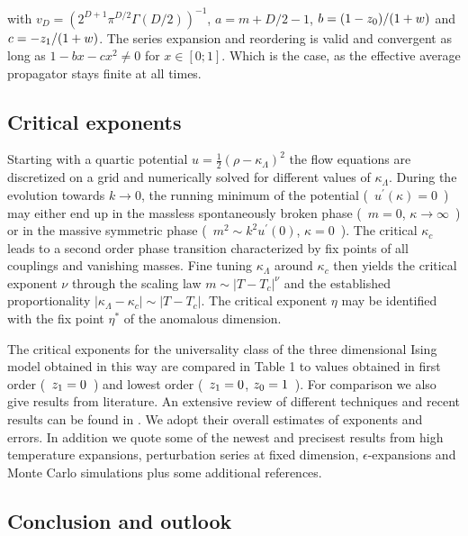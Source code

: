\documentclass[a4paper,aps,prl,twocolumn,groupedaddress]{revtex4}
\begin{document}
\bigskip
\noindent
with $ v_D = (2^{D+1} \pi^{D/2} \Gamma(D/2))^{-1} $, $ a = m+D/2-1 $, $ b = (1-z_0)/(1+w) $ and 
$ c = -z_1/(1+w) $. The series expansion and reordering is valid and convergent as long as
$ 1-bx-cx^2 \neq 0 $ for $ x \in [0;1] $. Which is the case, as the effective average propagator stays finite at all times.




\newpage
\subsection*{Critical exponents}

\noindent
Starting with a quartic potential $ u = \frac{1}{2}(\rho - \kappa_\Lambda)^2 $ 
the flow equations are discretized on a grid and numerically solved for different values of 
$ \kappa_\Lambda $. During the evolution towards $ k \to 0 $, the running minimum of the
potential (~$u^\prime(\kappa)=0$~) may either end up in the massless spontaneously broken phase 
(~$m=0$, $\kappa \to \infty $~) or in the massive symmetric phase (~$ m^2 \sim k^2 u^\prime(0)$, $\kappa = 0 $~). 
The critical $ \kappa_c $ leads to a second order phase transition characterized by fix points 
of all couplings and vanishing masses. Fine tuning $ \kappa_\Lambda $ around $ \kappa_c $ then
yields the critical exponent $ \nu $ through the scaling law $ m \sim | T-T_c |^\nu $
and the established proportionality $ | \kappa_\Lambda - \kappa_c | \sim | T - T_c | $.
The critical exponent $ \eta $ may be identified with the fix point $ \eta^* $ of the anomalous 
dimension. %

\bigskip
\noindent
The critical exponents for the universality class of the three dimensional Ising model
obtained in this way are compared in Table 1 to values obtained in first order (~$z_1=0$~)
and lowest order (~$z_1=0$, $z_0=1$~). For comparison we also give results from literature. 
An extensive review of different techniques and recent results can be found in \cite{Lit7}.
We adopt their overall estimates of exponents and errors. In addition we quote some of the 
newest and precisest results from high temperature expansions, perturbation series at fixed 
dimension, $\epsilon$-expansions and Monte Carlo simulations plus some additional references.

\subsection*{Conclusion and outlook}
\end{document}
